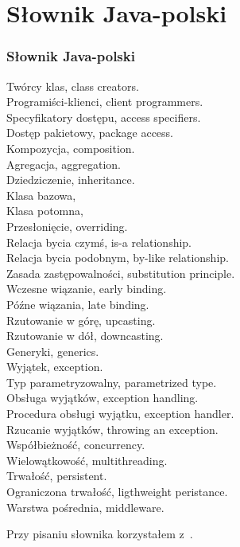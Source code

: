 \documentclass[10pt,t]{beamer}
\begin{document}
\section{Słownik Java-polski}


\begin{frame}
  \frametitle{Słownik Java-polski}

  Twórcy klas, class creators. \\
  Programiści-klienci, client programmers. \\
  Specyfikatory dostępu, access specifiers. \\
  Dostęp pakietowy, package access. \\
  Kompozycja, composition. \\
  Agregacja, aggregation. \\
  Dziedziczenie, inheritance. \\
  Klasa bazowa, \\
  Klasa potomna, \\
  Przesłonięcie, overriding. \\
  Relacja bycia czymś, is-a relationship. \\
  Relacja bycia podobnym, by-like relationship. \\
  Zasada zastępowalności, substitution principle. \\
  Wczesne wiązanie, early binding. \\
  Późne wiązania, late binding. \\
  Rzutowanie w górę, upcasting. \\
  Rzutowanie w dół, downcasting. \\
  Generyki, generics. \\
  Wyjątek, exception. \\
  Typ parametryzowalny, parametrized type. \\
  Obsługa wyjątków, exception handling. \\
  Procedura obsługi wyjątku, exception handler. \\
  Rzucanie wyjątków, throwing an exception. \\
  Współbieżność, concurrency. \\
  Wielowątkowość, multithreading. \\
  Trwałość, persistent. \\
  Ograniczona trwałość, ligthweight peristance. \\
  Warstwa pośrednia, middleware.


  Przy pisaniu słownika korzystałem
  z~\parencite{Eckel-Thinking-in-Java-Ed-polska-Wyd-III-Pub-2003}.

\end{frame}
\end{document}
